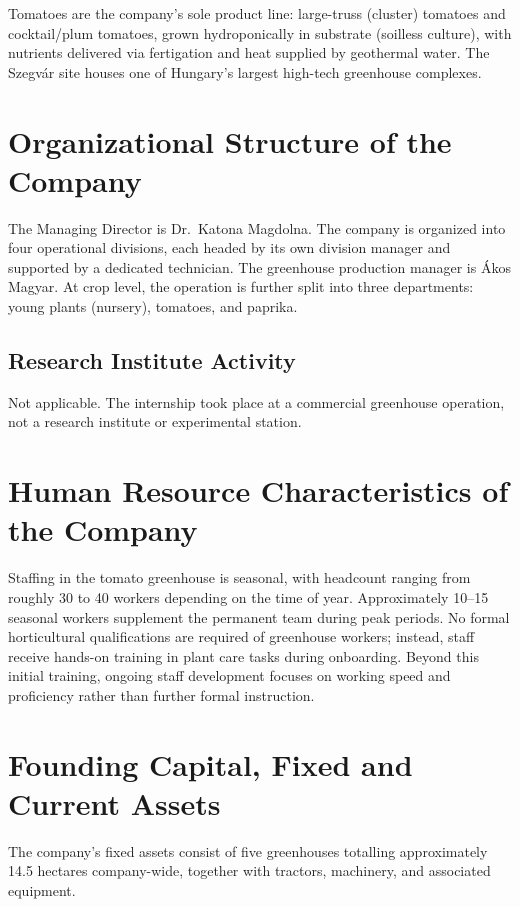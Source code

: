 Tomatoes are the company's sole product line: large-truss (cluster) tomatoes and cocktail/plum tomatoes, grown hydroponically in substrate (soilless culture), with nutrients delivered via fertigation and heat supplied by geothermal water. The Szegvár site houses one of Hungary's largest high-tech greenhouse complexes.

\section{Organizational Structure of the Company}
\label{sec:org-structure}
The Managing Director is Dr.\ Katona Magdolna. The company is organized into four operational divisions, each headed by its own division manager and supported by a dedicated technician. The greenhouse production manager is Ákos Magyar. At crop level, the operation is further split into three departments: young plants (nursery), tomatoes, and paprika.



\subsection{Research Institute Activity}
Not applicable. The internship took place at a commercial greenhouse operation, not a research institute or experimental station.

\section{Human Resource Characteristics of the Company}
\label{sec:human-resources}
Staffing in the tomato greenhouse is seasonal, with headcount ranging from roughly 30 to 40 workers depending on the time of year. Approximately 10--15 seasonal workers supplement the permanent team during peak periods. No formal horticultural qualifications are required of greenhouse workers; instead, staff receive hands-on training in plant care tasks during onboarding. Beyond this initial training, ongoing staff development focuses on working speed and proficiency rather than further formal instruction.

\section{Founding Capital, Fixed and Current Assets}
The company's fixed assets consist of five greenhouses totalling approximately 14.5 hectares company-wide, together with tractors, machinery, and associated equipment. 

